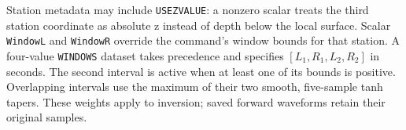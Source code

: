\documentclass[11pt]{report}
\begin{document}

Station metadata may include \texttt{USEZVALUE}: a nonzero scalar treats
the third station coordinate as absolute z instead of depth below the local
surface. Scalar \texttt{WindowL} and \texttt{WindowR} override the command's
window bounds for that station. A four-value \texttt{WINDOWS} dataset takes
precedence and specifies $[L_1,R_1,L_2,R_2]$ in seconds. The second interval is active when
at least one of its bounds is positive. Overlapping intervals use the maximum
of their two smooth, five-sample tanh tapers. These weights apply to inversion;
saved forward waveforms retain their original samples.


\end{document}
